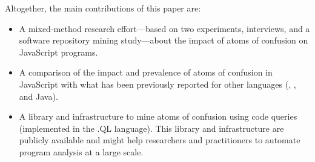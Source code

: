 
Altogether, the main contributions of this paper are:

\begin{itemize}
    
\item A mixed-method research effort---based on two experiments, interviews, and a software
  repository mining study---about the impact of atoms of confusion on JavaScript programs.

  \item A comparison of the impact and prevalence of atoms of confusion in
    JavaScript with what has been previously reported for other languages
    (\clang, \cpplang, and Java).
    \item A library and infrastructure to mine atoms of confusion using 
    code queries (implemented in the .QL language). This library and 
    infrastructure are publicly available and might help researchers and 
    practitioners to automate program analysis at a large scale.

\end{itemize}



